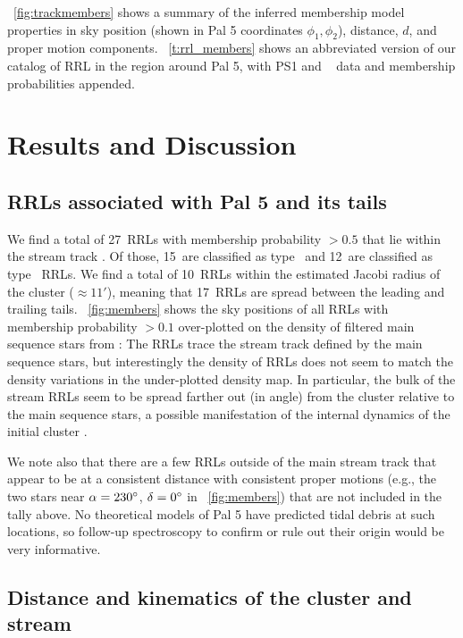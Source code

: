 \documentclass[twocolumn]{aastex63}
\newcommand{\NRRL}{27}     %
\newcommand{\NRRab}{15}    %
\newcommand{\NRRc}{12}     %
\newcommand{\NRRcl}{10}     %
\newcommand{\NRRtails}{17} %
\begin{document}
\figurename~\ref{fig:trackmembers} shows a summary of the inferred membership model properties in sky position (shown in Pal 5 coordinates $\phi_1, \phi_2$), distance, $d$, and proper motion components.
\tablename~\ref{t:rrl_members} shows an abbreviated version of our catalog of RRL in the region around Pal 5, with PS1 and \Gaia~ data and membership probabilities appended.

\section{Results and Discussion} \label{sec:results}

\subsection{RRLs associated with Pal 5 and its tails}
We find a total of \NRRL\ RRLs with membership probability $> 0.5$ that lie within the stream track \citep[again using the track from][see lines in Figure~\ref{fig:members}]{Bonaca:2019}.
Of those, \NRRab\ are classified as type \typeab\ and \NRRc\ are classified as type \typec\ RRLs.
We find a total of \NRRcl\ RRLs within the estimated Jacobi radius of the cluster ($\approx 11'$), meaning that \NRRtails\ RRLs are spread between the leading and trailing tails.
\figurename~\ref{fig:members} shows the sky positions of all RRLs with membership probability $>0.1$ over-plotted on the density of filtered main sequence stars from \citet{Bonaca:2019}:
The RRLs trace the stream track defined by the main sequence stars, but interestingly the density of RRLs does not seem to match the density variations in the under-plotted density map.
In particular, the bulk of the stream RRLs seem to be spread farther out (in angle) from the cluster relative to the main sequence stars, a possible manifestation of the internal dynamics of the initial cluster \citep[e.g., mass segregation][]{Koch:2004}.

We note also that there are a few RRLs outside of the main stream track that appear to be at a consistent distance with consistent proper motions (e.g., the two stars near $\alpha = 230\mbox{$^\circ$}$, $\delta = 0\mbox{$^\circ$}$ in \figurename~\ref{fig:members}) that are not included in the tally above.
No theoretical models of Pal 5 have predicted tidal debris at such locations, so follow-up spectroscopy to confirm or rule out their origin would be very informative.

\subsection{Distance and kinematics of the cluster and stream}
\end{document}
